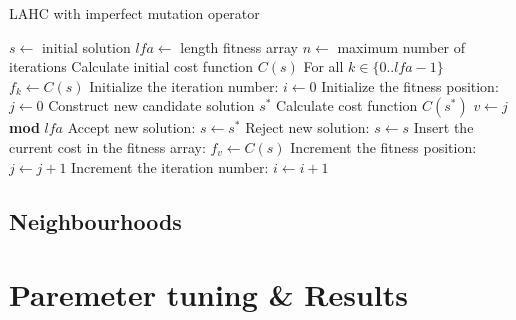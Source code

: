 \documentclass[]{article}
\begin{document}
\begin{algorithm}                      %
	\caption{LAHC with imperfect mutation operator}%
	\label{alg:lahc}                           %
	\begin{algorithmic}[1]                    %
		\REQUIRE $s \leftarrow$ initial solution
		\REQUIRE $lfa \leftarrow$ length fitness array
		\REQUIRE $n \leftarrow$ maximum number of iterations
		\STATE Calculate initial cost function $C(s)$
		\STATE For all $k \in \{0..lfa-1\}$ $f_k \leftarrow C(s)$
		\STATE Initialize the iteration number: $i \leftarrow 0$
		\STATE Initialize the fitness position: $j \leftarrow 0$
		\STATE Construct new candidate solution $s^*$
			\STATE Calculate cost function $C(s^*)$
			\STATE $v \leftarrow j$ \textbf{mod} $lfa$
				\STATE Accept new solution: $s \leftarrow s^*$
			\ELSE
				\STATE Reject new solution: $s \leftarrow s$
			\ENDIF
			\STATE Insert the current cost in the fitness array: $f_v \leftarrow C(s)$
			\STATE Increment the fitness position: $j \leftarrow j+1$
		\ENDIF
		\STATE Increment the iteration number: $i \leftarrow i+1$
		\ENDWHILE
	\end{algorithmic}
\end{algorithm}

\subsection{Neighbourhoods}

\section{Paremeter tuning \& Results}



\end{document}
